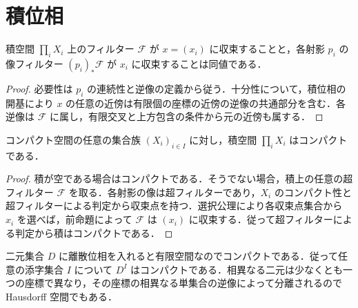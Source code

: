 \section{積位相}
\begin{prop}[積へのフィルターの収束]
積空間 $\prod_i X_i$ 上のフィルター $\mathcal F$ が $x=(x_i)$ に収束することと，各射影 $p_i$ の像フィルター $(p_i)_*\mathcal F$ が $x_i$ に収束することは同値である．
\end{prop}
\begin{proof}
必要性は $p_i$ の連続性と逆像の定義から従う．十分性について，積位相の開基により $x$ の任意の近傍は有限個の座標の近傍の逆像の共通部分を含む．各逆像は $\mathcal F$ に属し，有限交叉と上方包含の条件から元の近傍も属する．
\end{proof}
\begin{prop}[Tychonoffの定理]
コンパクト空間の任意の集合族 $(X_i)_{i\in I}$ に対し，積空間 $\prod_i X_i$ はコンパクトである．
\end{prop}
\begin{proof}
積が空である場合はコンパクトである．そうでない場合，積上の任意の超フィルター $\mathcal F$ を取る．各射影の像は超フィルターであり，$X_i$ のコンパクト性と超フィルターによる判定から収束点を持つ．選択公理により各収束点集合から $x_i$ を選べば，前命題によって $\mathcal F$ は $(x_i)$ に収束する．従って超フィルターによる判定から積はコンパクトである．
\end{proof}
\begin{prop}[二点離散空間の任意積]
二元集合 $D$ に離散位相を入れると有限空間なのでコンパクトである．従って任意の添字集合 $I$ について $D^I$ はコンパクトである．相異なる二元は少なくとも一つの座標で異なり，その座標の相異なる単集合の逆像によって分離されるので Hausdorff 空間でもある．
\end{prop}
